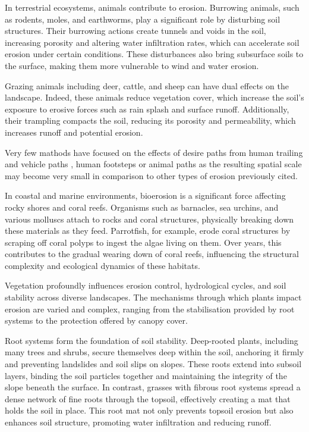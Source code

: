 In terrestrial ecosystems, animals contribute to erosion. Burrowing animals, such as rodents, moles, and earthworms, play a significant role by disturbing soil structures. Their burrowing actions create tunnels and voids in the soil, increasing porosity and altering water infiltration rates, which can accelerate soil erosion under certain conditions. These disturbances also bring subsurface soils to the surface, making them more vulnerable to wind and water erosion. 

Grazing animals including deer, cattle, and sheep can have dual effects on the landscape. Indeed, these animals reduce vegetation cover, which increase the soil's exposure to erosive forces such as rain splash and surface runoff. Additionally, their trampling compacts the soil, reducing its porosity and permeability, which increases runoff and potential erosion. 

Very few mathods have focused on the effects of desire paths from human trailing and vehicle paths \cite{Cordonnier2018,Jaiswal2019}, human footsteps \cite{Alvarado2024} or animal paths \cite{Ecormier-Nocca2021} as the resulting spatial scale may become very small in comparison to other types of erosion previously cited.

In coastal and marine environments, bioerosion is a significant force affecting rocky shores and coral reefs. Organisms such as barnacles, sea urchins, and various molluscs attach to rocks and coral structures, physically breaking down these materials as they feed. Parrotfish, for example, erode coral structures by scraping off coral polyps to ingest the algae living on them. Over years, this contributes to the gradual wearing down of coral reefs, influencing the structural complexity and ecological dynamics of these habitats.

Vegetation profoundly influences erosion control, hydrological cycles, and soil stability across diverse landscapes. The mechanisms through which plants impact erosion are varied and complex, ranging from the stabilisation provided by root systems to the protection offered by canopy cover.

Root systems form the foundation of soil stability. Deep-rooted plants, including many trees and shrubs, secure themselves deep within the soil, anchoring it firmly and preventing landslides and soil slips on slopes. These roots extend into subsoil layers, binding the soil particles together and maintaining the integrity of the slope beneath the surface. In contrast, grasses with fibrous root systems spread a dense network of fine roots through the topsoil, effectively creating a mat that holds the soil in place. This root mat not only prevents topsoil erosion but also enhances soil structure, promoting water infiltration and reducing runoff.

